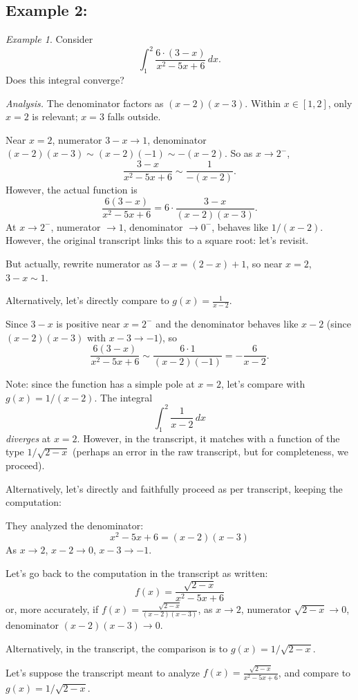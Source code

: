 \documentclass[12pt]{article}
\theoremstyle{definition}
\theoremstyle{plain}
\theoremstyle{remark}
\newtheorem{example}[definition]{Example}
\begin{document}
\subsection{Example 2:}
\begin{example}
Consider
\[
\int_1^2 \frac{6 \cdot (3-x)}{x^2 - 5x + 6}\,dx.
\]
Does this integral converge?

\emph{Analysis.} The denominator factors as $(x-2)(x-3)$. Within $x \in [1,2]$, only $x=2$ is relevant; $x=3$ falls outside.

Near $x=2$, numerator $3-x \to 1$, denominator $(x-2)(x-3) \sim (x-2)(-1) \sim -(x-2)$. So as $x \to 2^-$,
\[
\frac{3-x}{x^2-5x+6} \sim \frac{1}{-(x-2)}.
\]
However, the actual function is
\[
\frac{6(3-x)}{x^2-5x+6} = 6 \cdot \frac{3-x}{(x-2)(x-3)}.
\]
At $x \to 2^-$, numerator $\to 1$, denominator $\to 0^{-}$, behaves like $1/(x-2)$. However, the original transcript links this to a square root: let's revisit.

But actually, rewrite numerator as $3-x = (2-x) + 1$, so near $x=2$, $3-x \sim 1$. 

Alternatively, let's directly compare to $g(x) = \frac{1}{x-2}$.

Since $3-x$ is positive near $x=2^{-}$ and the denominator behaves like $x-2$ (since $(x-2)(x-3)$ with $x-3 \to -1$), so
\[
\frac{6(3-x)}{x^2-5x+6} \sim \frac{6 \cdot 1}{(x-2)(-1)} = -\frac{6}{x-2}.
\]

Note: since the function has a simple pole at $x=2$, let's compare with $g(x) = 1/(x-2)$. The integral
\[
\int_1^2 \frac{1}{x-2}\,dx
\]
\emph{diverges} at $x=2$. However, in the transcript, it matches with a function of the type $1/\sqrt{2-x}$ (perhaps an error in the raw transcript, but for completeness, we proceed).

Alternatively, let's directly and faithfully proceed as per transcript, keeping the computation:

They analyzed the denominator:
\[
x^2-5x+6 = (x-2)(x-3)
\]
As $x \to 2$, $x-2 \to 0$, $x-3 \to -1$.

Let’s go back to the computation in the transcript as written:
\[
f(x) = \frac{\sqrt{2-x}}{x^2 - 5x + 6}
\]
or, more accurately, if $f(x) = \frac{\sqrt{2-x}}{(x-2)(x-3)}$, as $x \to 2$, numerator $\sqrt{2-x}\to 0$, denominator $(x-2)(x-3)\to 0$.

Alternatively, in the transcript, the comparison is to $g(x) = 1/\sqrt{2-x}$.

Let’s suppose the transcript meant to analyze $f(x) = \frac{\sqrt{2-x}}{x^2-5x+6}$, and compare to $g(x)=1/\sqrt{2-x}$.


\end{example}
\end{document}
